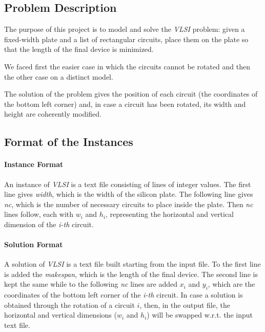 \subsection{Problem Description} 
    The purpose of this project is to model and solve the \textit{VLSI} problem: given a fixed-width plate and a list of 
    rectangular circuits, place them on the plate so that the length of the final device is minimized. 
    
    We faced first the easier case in which the circuits cannot be rotated and then the other case on a distinct model.

    The solution of the problem gives the position of each circuit (the coordinates of the bottom left corner) and,
    in case a circuit has been rotated, its width and height are coherently modified.


\subsection{Format of the Instances}
    \paragraph*{Instance Format}
        An instance of \textit{VLSI} is a text file consisting of lines of integer values. The first line gives \textit{width}, 
        which is the width of the silicon plate. The following line gives \textit{nc}, which is the number of necessary circuits 
        to place inside the plate. Then \textit{nc} lines follow, each with $w_i$ and $h_i$, representing the horizontal and 
        vertical dimension of the \textit{i-th} circuit.

    \paragraph*{Solution Format}
        A solution of \textit{VLSI} is a text file built starting from the input file. To the first line is added the \textit{makespan},
        which is the length of the final device. The second line is kept the same while to the following \textit{nc} lines are added
        $x_i$ and $y_i$, which are the coordinates of the bottom left corner of the \textit{i-th} circuit. In case a solution is obtained 
        through the rotation of a circuit $i$, then, in the output file, the horizontal and vertical dimensions ($w_i$ and $h_i$) 
        will be swapped w.r.t. the input text file.

